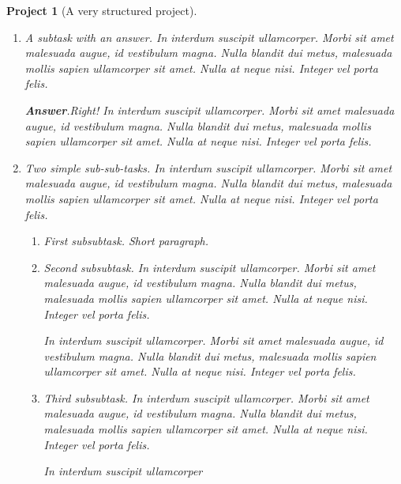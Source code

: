 \documentclass[pdflatex]{sn-jnl}
\theoremstyle{thmstyleone}%
\theoremstyle{thmstyletwo}%
\newtheorem{project}[theorem]{Project}
\theoremstyle{thmstylethree}%
\newcommand{\blocktitlefont}{\relax}
\numberwithin{equation}{section}
\begin{document}
\begin{project}[A very structured project]
\begin{enumerate}[font=\bfseries,label=(\alph*),ref=\alph*]
\begin{enumerate}[font=\bfseries,label=(\roman*),ref=\theenumi.\roman*]
A short paragraph, before an answer.%
\par\smallskip%
\noindent\textbf{\blocktitlefont Answer}.\hypertarget{project-structured-6-2-2}{}\quad{}With a proof.%
\begin{proof}\label{project-structured-6-2-2-2}%
In interdum suscipit ullamcorper. Morbi sit amet malesuada augue, id vestibulum magna. Nulla blandit dui metus, malesuada mollis sapien ullamcorper sit amet. Nulla at neque nisi. Integer vel porta felis.%
\end{proof}
And a bit more to say.%
\item{}A subtask with an answer.  In interdum suscipit ullamcorper. Morbi sit amet malesuada augue, id vestibulum magna. Nulla blandit dui metus, malesuada mollis sapien ullamcorper sit amet. Nulla at neque nisi. Integer vel porta felis.%
\par\smallskip%
\noindent\textbf{\blocktitlefont Answer}.\hypertarget{project-structured-6-3-2}{}\quad{}Right!  In interdum suscipit ullamcorper. Morbi sit amet malesuada augue, id vestibulum magna. Nulla blandit dui metus, malesuada mollis sapien ullamcorper sit amet. Nulla at neque nisi. Integer vel porta felis.%
\item\label{project-task-level-two}Two simple sub-sub-tasks.  In interdum suscipit ullamcorper. Morbi sit amet malesuada augue, id vestibulum magna. Nulla blandit dui metus, malesuada mollis sapien ullamcorper sit amet. Nulla at neque nisi. Integer vel porta felis.%
\begin{enumerate}[font=\bfseries,label=(\Alph*),ref=\theenumi.\theenumii.\Alph*]%
\item{}First subsubtask.  Short paragraph.%
\item{}Second subsubtask.  In interdum suscipit ullamcorper. Morbi sit amet malesuada augue, id vestibulum magna. Nulla blandit dui metus, malesuada mollis sapien ullamcorper sit amet. Nulla at neque nisi. Integer vel porta felis.%
\par
In interdum suscipit ullamcorper. Morbi sit amet malesuada augue, id vestibulum magna. Nulla blandit dui metus, malesuada mollis sapien ullamcorper sit amet. Nulla at neque nisi. Integer vel porta felis.%
\item\label{deep-terminal-task}Third subsubtask.  In interdum suscipit ullamcorper. Morbi sit amet malesuada augue, id vestibulum magna. Nulla blandit dui metus, malesuada mollis sapien ullamcorper sit amet. Nulla at neque nisi. Integer vel porta felis.%
\par
In interdum suscipit ullamcorper%

\end{enumerate}
\end{enumerate}
\end{enumerate}
\end{project}
\end{document}
